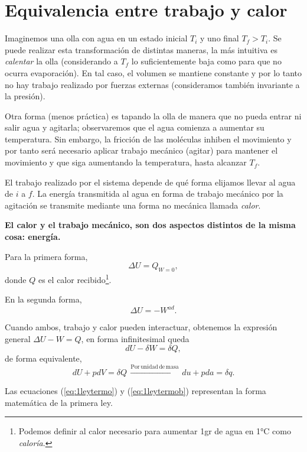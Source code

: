 \documentclass[openany]{book}
\begin{document}
\section{Equivalencia entre trabajo y calor}
Imaginemos una olla con agua en un estado inicial $T_i$ y uno final $T_f>T_i$. Se puede realizar esta transformación de distintas maneras, la más intuitiva es \emph{calentar} la olla (considerando a $T_f$ lo suficientemente baja como para que no ocurra evaporación). En tal caso, el volumen se mantiene constante y por lo tanto no hay trabajo realizado por fuerzas externas (consideramos también invariante a la presión).\par Otra forma (menos práctica) es tapando la olla de manera que no pueda entrar ni salir agua y agitarla; observaremos que el agua comienza a aumentar su temperatura. Sin embargo, la fricción de las moléculas inhiben el movimiento y por tanto será necesario aplicar trabajo mecánico (agitar) para mantener el movimiento y que siga aumentando la temperatura, hasta alcanzar $T_f$.\par El trabajo realizado por el sistema depende de qué forma elijamos llevar al agua de $i$ a $f$. La energía transmitida al agua en forma de trabajo mecánico por la agitación se transmite mediante una forma no mecánica llamada \emph{calor}.\par \textbf{El calor y el trabajo mecánico, son dos aspectos distintos de la misma cosa: energía.}\par
Para la primera forma,
\begin{equation*}
	\Delta U=Q_{W=0},
\end{equation*}
donde $Q$ es el calor recibido\footnote{Podemos definir al calor necesario para aumentar 1gr de agua en 1°C como \emph{caloría}.}. \par
En la segunda forma,
\begin{equation*}
	\Delta U=-W^{ad}.
\end{equation*}
\par Cuando ambos, trabajo y calor pueden interactuar, obtenemos la expresión general $\Delta U-W=Q$, en forma infinitesimal queda
\begin{equation}\label{eq:1leytermo}
	dU-\delta W=\delta Q,
\end{equation}
de forma equivalente,
\begin{equation}\label{eq:1leytermob}
	dU+pdV=\delta Q\,\xrightarrow{\mathrm{Por\,unidad\,de\,masa\,}}du+pda=\delta q.
\end{equation}
\par Las ecuaciones (\ref{eq:1leytermo}) y (\ref{eq:1leytermob}) representan la forma matemática de la primera ley.
\end{document}
